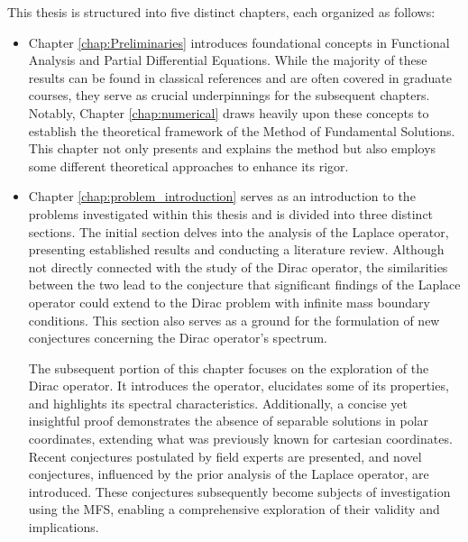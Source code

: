 This thesis is structured into five distinct chapters, each organized as follows:
\begin{itemize}
\item Chapter \ref{chap:Preliminaries} introduces foundational concepts in Functional Analysis and Partial Differential Equations. While the majority of these results can be found in classical references and are often covered in graduate courses, they serve as crucial underpinnings for the subsequent chapters. Notably, Chapter \ref{chap:numerical} draws heavily upon these concepts to establish the theoretical framework of the Method of Fundamental Solutions. This chapter not only presents and explains the method but also employs some different theoretical approaches to enhance its rigor.
\item Chapter \ref{chap:problem_introduction} serves as an introduction to the problems investigated within this thesis and is divided into three distinct sections. The initial section delves into the analysis of the Laplace operator, presenting established results and conducting a literature review. Although not directly connected with the study of the Dirac operator, the similarities between the two lead to the conjecture that significant findings of the Laplace operator could extend to the Dirac problem with infinite mass boundary conditions. This section also serves as a ground for the formulation of new conjectures concerning the Dirac operator's spectrum.

The subsequent portion of this chapter focuses on the exploration of the Dirac operator. It introduces the operator, elucidates some of its properties, and highlights its spectral characteristics. Additionally, a concise yet insightful proof demonstrates the absence of separable solutions in polar coordinates, extending what was previously known for cartesian coordinates. Recent conjectures postulated by field experts are presented, and novel conjectures, influenced by the prior analysis of the Laplace operator, are introduced. These conjectures subsequently become subjects of investigation using the \ac{MFS}, enabling a comprehensive exploration of their validity and implications.


\end{itemize}
